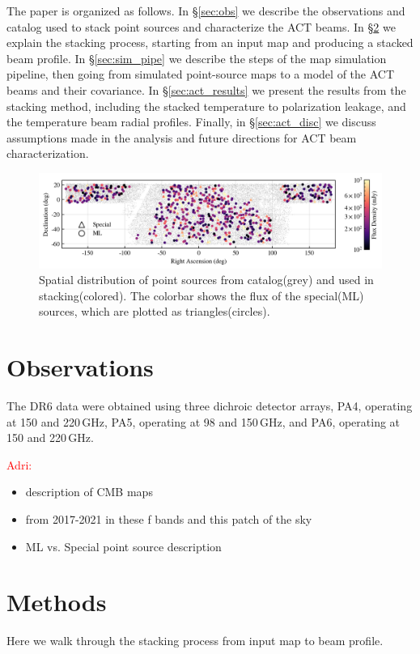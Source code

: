 The paper is organized as follows. 
In \S\ref{sec:obs} we describe the observations and catalog used to stack point sources and characterize the ACT beams.  In \S\ref{sec:stack} we explain the stacking process, starting from an input map and producing a stacked beam profile.  In \S\ref{sec:sim_pipe} we describe the steps of the map simulation pipeline, then going from simulated point-source maps to a model of the ACT beams and their covariance.  In \S\ref{sec:act_results} we present the results from the stacking method, including the stacked temperature to polarization leakage, and the temperature beam radial profiles.  Finally, in \S\ref{sec:act_disc} we discuss assumptions made in the analysis and future directions for ACT beam characterization.

\begin{figure}[t]
    \centering
    \includegraphics[width = \textwidth]{Figures/ptsrc_map.png}
    \caption{Spatial distribution of point sources from catalog(grey) and used in stacking(colored).  The colorbar shows the flux of the special(ML) sources, which are plotted as triangles(circles).}
    \label{fig:ptsrc_map}
\end{figure}

\section{Observations}
\label{sec:observations}

The DR6 data were obtained using three dichroic detector arrays, PA4, operating at 150 and 220\,GHz, PA5, operating at 98 and 150\,GHz, and PA6, operating at 150 and 220\,GHz.

\textcolor{red}{Adri:}
\label{sec:obs}
\begin{itemize}
    \item description of CMB maps
    \item from 2017-2021 in these f bands and this patch of the sky
    \item ML vs. Special point source description
\end{itemize}

\section{Methods}
\label{sec:stack}
Here we walk through the stacking process from input map to beam profile.  
